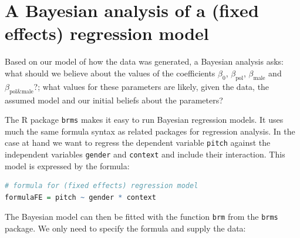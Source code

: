 \documentclass[nobib]{tufte-handout}
\begin{document}
\section{A Bayesian analysis of a (fixed effects) regression model}

Based on our model of how the data was generated, a Bayesian analysis asks: what should we
believe about the values of the coefficients $\beta_0$, $\beta_{\text{pol}}$,
$\beta_{\text{male}}$ and $\beta_{\text{pol\&male}}$?; what values for these parameters are
likely, given the data, the assumed model and our initial beliefs about the parameters?
%
%
%

The R package \texttt{brms} \citep{buerkner2016brms} makes it easy to run Bayesian regression models. It uses much the same formula syntax as related packages for regression analysis. In the case at hand we want to regress the dependent variable \texttt{pitch} against the independent variables \texttt{gender} and \texttt{context} and include their interaction. This model is expressed by the formula:

\begin{minipage}[]{\textwidth}
\begin{lstlisting}[language=R]
# formula for (fixed effects) regression model
formulaFE = pitch ~ gender * context
\end{lstlisting}
\end{minipage}

The Bayesian model can then be fitted with the function \texttt{brm} from the \texttt{brms} package. We only need to specify the formula and supply the data:
\end{document}
